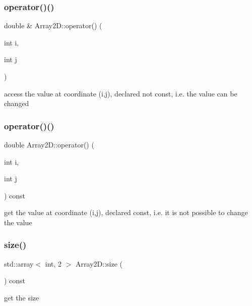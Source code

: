 \subsubsection{\texorpdfstring{operator()()}{operator()()}\hspace{0.1cm}{\footnotesize\ttfamily [1/2]}}
{\footnotesize\ttfamily double \& Array2\+D\+::operator() (\begin{DoxyParamCaption}\item[{int}]{i,  }\item[{int}]{j }\end{DoxyParamCaption})}



access the value at coordinate (i,j), declared not const, i.\+e. the value can be changed 

\mbox{\label{classArray2D_af745718ec25b815051de2d0c3c94e0d2}} 
\subsubsection{\texorpdfstring{operator()()}{operator()()}\hspace{0.1cm}{\footnotesize\ttfamily [2/2]}}
{\footnotesize\ttfamily double Array2\+D\+::operator() (\begin{DoxyParamCaption}\item[{int}]{i,  }\item[{int}]{j }\end{DoxyParamCaption}) const}



get the value at coordinate (i,j), declared const, i.\+e. it is not possible to change the value 

\mbox{\label{classArray2D_accf87be860645d6c50d6ba6fa39ec6f9}} 
\subsubsection{\texorpdfstring{size()}{size()}}
{\footnotesize\ttfamily std\+::array$<$ int, 2 $>$ Array2\+D\+::size (\begin{DoxyParamCaption}{ }\end{DoxyParamCaption}) const}



get the size 



